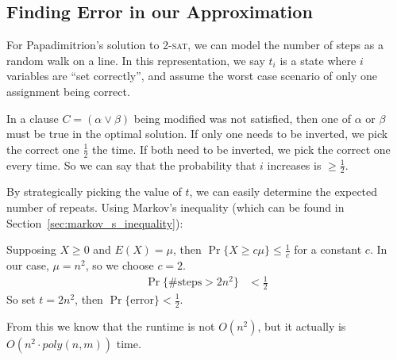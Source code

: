                 \subsection{Finding Error in our Approximation} %
                \label{sub:finding_error_in_our_approximation}
                    For Papadimitrion's solution to 2-\textsc{sat}, we can model the number of steps as a random walk on a line.
                    In this representation, we say $t_i$ is a state where $i$ variables are ``set correctly'', and assume the worst case scenario of only one assignment being correct.

                    In a clause $C = (\alpha \lor \beta)$ being modified was not satisfied, then one of $\alpha$ or $\beta$ must be true in the optimal solution.
                    If only one needs to be inverted, we pick the correct one $\frac{1}{2}$ the time.
                    If both need to be inverted, we pick the correct one every time.
                    So we can say that the probability that $i$ increases is $\ge \frac{1}{2}$.

                    By strategically picking the value of $t$, we can easily determine the expected number of repeats.
                    Using Markov's inequality (which can be found in Section~\ref{sec:markov_s_inequality}):

                    Supposing $X \ge 0$ and $E(X) = \mu$, then $\Pr\{ X \ge c \mu\} \le \frac{1}{c}$ for a constant $c$.
                    In our case, $\mu = n^2$, so we choose $c = 2$.
                    \begin{align*}
                        \Pr \{ \text{\# steps} > 2n^2 \} &< \frac{1}{2}
                    \end{align*}
                    So set $t = 2n^2$, then $\Pr\{\text{error}\} < \frac{1}{2}$.

                    From this we know that the runtime is not $O(n^2)$, but it actually is $O(n^2 \cdot poly(n, m))$ time.
